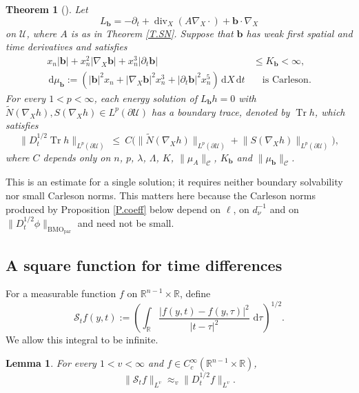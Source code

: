 \documentclass[12pt,leqno]{amsart}
\numberwithin{equation}{section}
\DeclareMathOperator{\divg}{div}
\newcommand{\R}{\mathbb R}
\newcommand{\abs}[1]{\left\vert#1\right\vert}
\newcommand{\br}[1]{\left(#1\right)}
\newcommand{\pd}{\partial}
\newcommand{\dhalf}{D_t^{1/2}}
\newcommand{\BMOpar}{\mathrm{BMO}_{\mathrm{par}}}
\newcommand{\Uc}{\mathcal U}
\newcommand{\Cc}{\mathcal C}
\newcommand{\Nt}{\widetilde N}
\renewcommand{\d}{\,\mathrm d}
\newcommand{\Cnorm}[1]{\|#1\|_{\Cc}}
\theoremstyle{plain}
\newtheorem{theorem}[equation]{Theorem}
\newtheorem{lemma}[equation]{Lemma}
\theoremstyle{remark}
\begin{document}
\begin{theorem}[{\cite[Theorem 1.7]{DLPN}}]\label{T.half}
Let
$$L_{\mathbf b}=-\pd_t+\divg_X(A\nabla_X\cdot)
  +\mathbf b\cdot\nabla_X$$
on $\Uc$, where $A$ is as in Theorem \ref{T.SN}. Suppose that $\mathbf b$
has weak first spatial and time derivatives and satisfies
\begin{equation}\label{E.ghyp}
 \begin{aligned}
  x_n\abs{\mathbf b}+x_n^2\abs{\nabla_X\mathbf b}
  +x_n^3\abs{\pd_t\mathbf b}&\le K_{\mathbf b}<\infty,\\
  \d\mu_{\mathbf b}:=
  \br{\abs{\mathbf b}^2x_n+\abs{\nabla_X\mathbf b}^2x_n^3
  +\abs{\pd_t\mathbf b}^2x_n^5}\d X\d t
  &\quad\text{is Carleson}.
 \end{aligned}
\end{equation}
For every $1<p<\infty$, each energy solution of $L_{\mathbf b}h=0$ with
$\Nt(\nabla_Xh),S(\nabla_Xh)\in L^p(\pd\Uc)$ has a boundary trace,
denoted by $\operatorname{Tr}h$, which satisfies
\begin{equation}\label{E.target}
  \big\|\dhalf\operatorname{Tr}h\big\|_{L^p(\pd\Uc)}\ \le\
  C\Big(\big\|\Nt(\nabla_Xh)\big\|_{L^p(\pd\Uc)}
   +\big\|S(\nabla_Xh)\big\|_{L^p(\pd\Uc)}\Big),
\end{equation}
where $C$ depends only on $n$, $p$, $\lambda$, $\Lambda$, $K$,
$\Cnorm{\mu_A}$, $K_{\mathbf b}$ and $\Cnorm{\mu_{\mathbf b}}$.
\end{theorem}

\noindent This is an estimate for a single solution; it requires neither
boundary solvability nor small Carleson norms. This matters here because the
Carleson norms produced by Proposition \ref{P.coeff} below depend on $\ell$,
on $d_\nu^{-1}$ and on $\|\dhalf\phi\|_{\BMOpar}$ and need not be small.

\subsection{A square function for time differences}\label{ss.timesquare}

For a measurable function $f$ on $\R^{n-1}\times\R$, define
\begin{equation}\label{E.timesquaredef}
 \mathcal S_t f(y,t):=
 \left(\int_\R\frac{|f(y,t)-f(y,\tau)|^2}{|t-\tau|^2}\,\d\tau\right)^{1/2}.
\end{equation}
We allow this integral to be infinite.

\begin{lemma}\label{L.timesquare}
For every $1<v<\infty$ and $f\in C_c^\infty(\R^{n-1}\times\R)$,
\begin{equation}\label{E.timesquare}
 \|\mathcal S_t f\|_{L^v}\approx_v\|\dhalf f\|_{L^v}.
\end{equation}
\end{lemma}
\end{document}
